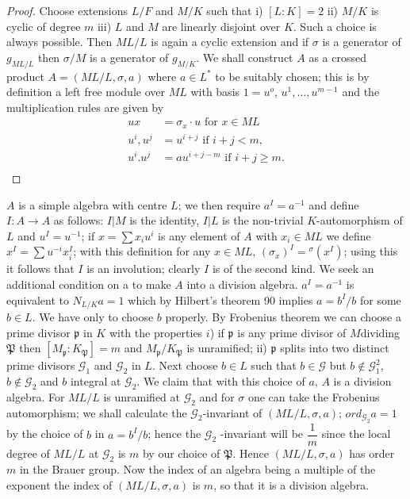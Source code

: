  \begin{proof}
Choose extensions $L/F$ and $M/K$ such that i) $[L:K]=2$ ii) $M/K$ is
cyclic of degree $m$ iii) $L$ and $M$ are linearly disjoint over
$K$. Such a choice is always possible. Then $ML/L$ is again a cyclic
extension and if $\sigma$ is a generator of $g_{ML/L}$ then $\sigma/M$
is a generator of $g_{M/K}$. We shall construct $A$ as a crossed
product $A=(ML/L, \sigma,a)$  where  $a \in L^*$ to be suitably chosen;
this is by definition a left free module over $ML$ with basis
$1=u^o$, $u^1,\ldots,u^{m-1}$ and the multiplication rules are given by  
\begin{align*}
ux & = \sigma_x \cdot u \text{ for } x \in ML \\
u^i,u^j & = u^{i+j} \text{ if } i+j<m,\\
u^i. u^j & = au^{i+j-m} \text{ if } i+j\ge m.\\
\end{align*}
  \end{proof}  
  $A$ is a simple algebra with centre $L$; we then require $a^I=a^{-1}$
  and define $I : A \to A$ as follows: $I|M$ is the identity, $I|L$ is
  the non-trivial $K$-automorphism of $L$ and $u^I=u^{-1}$; if $x=\sum
  x_i u^i$ is any element of $A$ with $x_i \in ML$ we define $x^I =
  \sum u^{-i}x^I_i$; with this definition for any $x \in ML$,
  $(\sigma_x)^I = {}^\sigma(x^I)$; using this it follows that $I$ is an
  involution; clearly $I$ is of the second kind. We seek an additional
  condition on a to make $A$ into a division algebra. $a^I=a^{-1}$ is
  equivalent to $N_{L/K} a=1$ which by Hilbert's theorem 90 implies
  $a=b^I/b$ for some $b \in L$. We have only to choose $b$ properly. By
  Frobenius theorem we can choose a prime divisor $\mathfrak{p}$ in
  $K$ with the properties $i$) if $\mathfrak{p}$ is any prime divisor
  of $M$\pageoriginale dividing $\mathfrak{P}$ then $[M_\mathfrak{p} :
    K_\mathfrak{P}]=m$ and $M_{\mathfrak{p}}/ K_{\mathfrak{P}}$ is
  unramified; ii) $\mathfrak{p}$ splits into two distinct prime
  divisors $\mathscr{G}_1$ and $\mathscr{G}_2$ in $L$. Next choose $b
  \in L$ such that $b \in \mathscr{G}$ but $b \notin \mathscr{G}^2_1$,
  $b \notin \mathscr{G}_2$ and $b$ integral at $\mathscr{G}_2$. We
  claim  that with this choice of $a$, $A$ is a division algebra. For
  $ML/L$ is unramified at $\mathscr{G}_2$ and for $\sigma$ one can
  take the Frobenius automorphism; we shall calculate the
  $\mathscr{G}_2$-invariant of $(ML/L, \sigma,a)$; $ord_{\mathscr{G}_2}
  a=1$ by the choice of $b$ in $a=b^I/b$; hence the $\mathscr{G}_2$
  -invariant will be $\dfrac{1}{m}$ since the local degree of $ML/L$
  at $\mathscr{G}_2$ is $m$ by our choice of $\mathfrak{P}$. Hence
  $(ML/L, \sigma,a)$ has order $m$ in the Brauer group. Now the index
  of an algebra being a multiple of the exponent the index of $(ML/L,
  \sigma, a)$ is $m$, so that it is a division algebra.  

